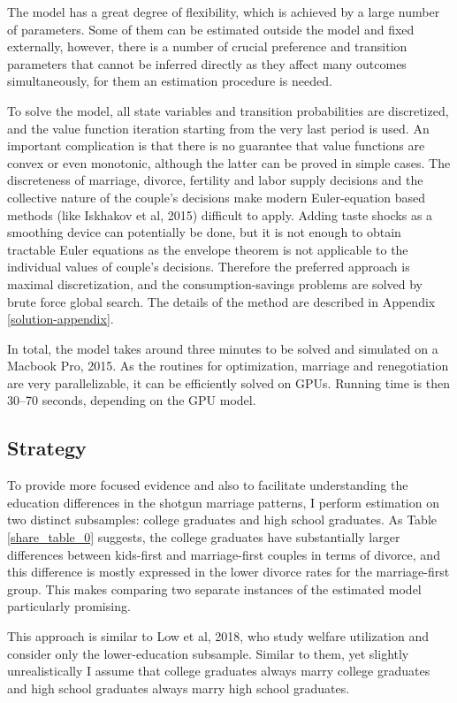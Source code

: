 \documentclass[12pt,letter]{article}
\begin{document}
The model has a great degree of flexibility, which is achieved by a large number of parameters. Some of them can be estimated outside the model and fixed externally, however, there is a number of crucial preference and transition parameters that cannot be inferred directly as they affect many outcomes simultaneously, for them an estimation procedure is needed.

To solve the model, all state variables and transition probabilities are discretized, and the value function iteration starting from the very last period is used. An important complication is that there is no guarantee that value functions are convex or even monotonic, although the latter can be proved in simple cases. The discreteness of marriage, divorce, fertility and labor supply decisions and the collective nature of the couple's decisions make modern Euler-equation based methods (like Iskhakov et al, 2015\nocite{iskhakov2015estimating}) difficult to apply. Adding taste shocks as a smoothing device can potentially be done, but it is not enough to obtain tractable Euler equations as the envelope theorem is not applicable to the individual values of couple's decisions. Therefore the preferred approach is maximal discretization, and the consumption-savings problems are solved by brute force global search. The details of the method are described in Appendix \ref{solution-appendix}. 

In total, the model takes around three minutes to be solved and simulated on a Macbook Pro, 2015. As the routines for optimization, marriage and renegotiation are very parallelizable, it can be efficiently solved on GPUs. Running time is then 30--70 seconds, depending on the GPU model.

\subsection{Strategy}
To provide more focused evidence and also to facilitate understanding the education differences in the shotgun marriage patterns, I perform estimation on two distinct subsamples: college graduates and high school graduates. As Table \ref{share_table_0} suggests, the college graduates have substantially larger differences between kids-first and marriage-first couples in terms of divorce, and this difference is mostly expressed in the lower divorce rates for the marriage-first group. This makes comparing two separate instances of the estimated model particularly promising.

This approach is similar to Low et al, 2018, who study welfare utilization and consider only the lower-education subsample. Similar to them, yet slightly unrealistically I assume that college graduates always marry college graduates and high school graduates always marry high school graduates.
\end{document}
